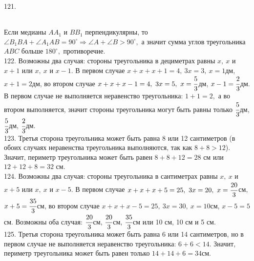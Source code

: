 \documentclass[12pt]{article}
\begin{document}
121. \begin{figure}[ht!]
\end{figure}\\
Если медианы $AA_1$ и $BB_1$ перпендикулярны, то $\angle B_1BA+\angle A_1AB=90^\circ\Rightarrow\angle A+\angle B>90^\circ,$ а значит сумма углов треугольника $ABC$ больше $180^\circ,$ противоречие.\\
122. Возможны два случая: стороны треугольника в дециметрах равны $x,\ x$ и $x+1$ или $x,\ x$ и $x-1.$ В первом случае $x+x+x+1=4,\ 3x=3,\ x=1$дм, $x+1=2$дм, во втором случае $x+x+x-1=4,\ 3x=5,\ x=\cfrac{5}{3}$дм, $x-1=\cfrac{2}{3}$дм. В первом случае не выполняется неравенство треугольника: $1+1=2,$ а во втором выполняется, значит стороны треугольника могут быть равны только $\cfrac{5}{3}$дм, $\cfrac{5}{3}$дм, $\cfrac{2}{3}$дм.\\
123. Третья сторона треугольника может быть равна 8 или 12 сантиметров (в обоих случаях неравенства треугольника выполняются, так как $8+8>12$). Значит, периметр треугольника может быть равен $8+8+12=28$ см или $12+12+8=32$ см.\\
124. Возможны два случая: стороны треугольника в сантиметрах равны $x,\ x$ и $x+5$ или $x,\ x$ и $x-5.$ В первом случае $x+x+x+5=25,\ 3x=20,\ x=\cfrac{20}{3}$см, $x+5=\cfrac{35}{3}$см, во втором случае $x+x+x-5=25,\ 3x=30,\ x=10$см, $x-5=5$см. Возможны оба случая: $\cfrac{20}{3}$см, $\cfrac{20}{3}$см, $\cfrac{35}{3}$см или 10 см, 10 см и 5 см.\\
125. Третья сторона треугольника может быть равна 6 или 14 сантиметров, но в первом случае не выполняется неравенство треугольника: $6+6<14.$ Значит, периметр треугольника может быть равен только $14+14+6=34$см.\\
\end{document}
